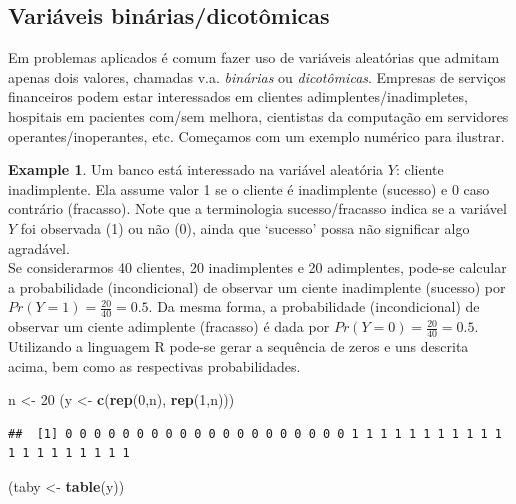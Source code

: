 \documentclass[
]{book}
\newenvironment{Shaded}{\begin{snugshade}}{\end{snugshade}}
\newcommand{\DecValTok}[1]{\textcolor[rgb]{0.00,0.00,0.81}{#1}}
\newcommand{\KeywordTok}[1]{\textcolor[rgb]{0.13,0.29,0.53}{\textbf{#1}}}
\newcommand{\NormalTok}[1]{#1}
\newcommand{\StringTok}[1]{\textcolor[rgb]{0.31,0.60,0.02}{#1}}
\theoremstyle{definition}
\theoremstyle{definition}
\newtheorem{example}{Example}[chapter]
\theoremstyle{definition}
\theoremstyle{remark}
\begin{document}
\hypertarget{variuxe1veis-binuxe1riasdicotuxf4micas}{%
\subsection{Variáveis binárias/dicotômicas}\label{variuxe1veis-binuxe1riasdicotuxf4micas}}

Em problemas aplicados é comum fazer uso de variáveis aleatórias que admitam apenas dois valores, chamadas v.a. \emph{binárias} ou \emph{dicotômicas}. Empresas de serviços financeiros podem estar interessados em clientes adimplentes/inadimpletes, hospitais em pacientes com/sem melhora, cientistas da computação em servidores operantes/inoperantes, etc. Começamos com um exemplo numérico para ilustrar.

\begin{example}
\protect\hypertarget{exm:unnamed-chunk-131}{}{\label{exm:unnamed-chunk-131} }Um banco está interessado na variável aleatória \(Y\): cliente inadimplente. Ela assume valor 1 se o cliente é inadimplente (sucesso) e 0 caso contrário (fracasso). Note que a terminologia sucesso/fracasso indica se a variável \(Y\) foi observada (1) ou não (0), ainda que `sucesso' possa não significar algo agradável.\\
Se considerarmos 40 clientes, 20 inadimplentes e 20 adimplentes, pode-se calcular a probabilidade (incondicional) de observar um ciente inadimplente (sucesso) por \(Pr(Y=1)=\frac{20}{40}=0.5\). Da mesma forma, a probabilidade (incondicional) de observar um ciente adimplente (fracasso) é dada por \(Pr(Y=0)=\frac{20}{40}=0.5\). Utilizando a linguagem R pode-se gerar a sequência de zeros e uns descrita acima, bem como as respectivas probabilidades.
\end{example}

\begin{Shaded}
\begin{Highlighting}[]
\NormalTok{n \textless{}{-}}\StringTok{ }\DecValTok{20}
\NormalTok{(y \textless{}{-}}\StringTok{ }\KeywordTok{c}\NormalTok{(}\KeywordTok{rep}\NormalTok{(}\DecValTok{0}\NormalTok{,n), }\KeywordTok{rep}\NormalTok{(}\DecValTok{1}\NormalTok{,n)))}
\end{Highlighting}
\end{Shaded}

\begin{verbatim}
##  [1] 0 0 0 0 0 0 0 0 0 0 0 0 0 0 0 0 0 0 0 0 1 1 1 1 1 1 1 1 1 1 1 1 1 1 1 1 1 1 1 1
\end{verbatim}

\begin{Shaded}
\begin{Highlighting}[]
\NormalTok{(taby \textless{}{-}}\StringTok{ }\KeywordTok{table}\NormalTok{(y))}
\end{Highlighting}
\end{Shaded}
\end{document}
